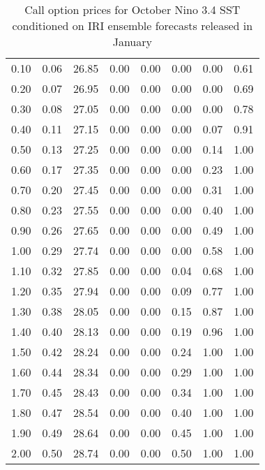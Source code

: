 \begin{table*}[ht]
\begin{tabular}{rrrrrrrr}
  0.10 & 0.06 & 26.85 & 0.00 & 0.00 & 0.00 & 0.00 & 0.61 \\ 
  0.20 & 0.07 & 26.95 & 0.00 & 0.00 & 0.00 & 0.00 & 0.69 \\ 
  0.30 & 0.08 & 27.05 & 0.00 & 0.00 & 0.00 & 0.00 & 0.78 \\ 
  0.40 & 0.11 & 27.15 & 0.00 & 0.00 & 0.00 & 0.07 & 0.91 \\ 
  0.50 & 0.13 & 27.25 & 0.00 & 0.00 & 0.00 & 0.14 & 1.00 \\ 
  0.60 & 0.17 & 27.35 & 0.00 & 0.00 & 0.00 & 0.23 & 1.00 \\ 
  0.70 & 0.20 & 27.45 & 0.00 & 0.00 & 0.00 & 0.31 & 1.00 \\ 
  0.80 & 0.23 & 27.55 & 0.00 & 0.00 & 0.00 & 0.40 & 1.00 \\ 
  0.90 & 0.26 & 27.65 & 0.00 & 0.00 & 0.00 & 0.49 & 1.00 \\ 
  1.00 & 0.29 & 27.74 & 0.00 & 0.00 & 0.00 & 0.58 & 1.00 \\ 
  1.10 & 0.32 & 27.85 & 0.00 & 0.00 & 0.04 & 0.68 & 1.00 \\ 
  1.20 & 0.35 & 27.94 & 0.00 & 0.00 & 0.09 & 0.77 & 1.00 \\ 
  1.30 & 0.38 & 28.05 & 0.00 & 0.00 & 0.15 & 0.87 & 1.00 \\ 
  1.40 & 0.40 & 28.13 & 0.00 & 0.00 & 0.19 & 0.96 & 1.00 \\ 
  1.50 & 0.42 & 28.24 & 0.00 & 0.00 & 0.24 & 1.00 & 1.00 \\ 
  1.60 & 0.44 & 28.34 & 0.00 & 0.00 & 0.29 & 1.00 & 1.00 \\ 
  1.70 & 0.45 & 28.43 & 0.00 & 0.00 & 0.34 & 1.00 & 1.00 \\ 
  1.80 & 0.47 & 28.54 & 0.00 & 0.00 & 0.40 & 1.00 & 1.00 \\ 
  1.90 & 0.49 & 28.64 & 0.00 & 0.00 & 0.45 & 1.00 & 1.00 \\ 
  2.00 & 0.50 & 28.74 & 0.00 & 0.00 & 0.50 & 1.00 & 1.00 \\ 
   \hline
\end{tabular}
\caption{Call option prices for October Nino 3.4 SST conditioned on IRI ensemble forecasts released in January} 
\end{table*}

